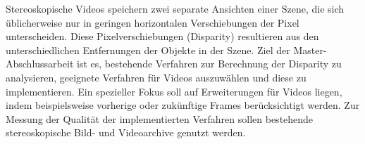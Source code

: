 Stereoskopische Videos speichern zwei separate Ansichten einer Szene, die sich {\"u}blicherweise nur in geringen horizontalen Verschiebungen der Pixel unterscheiden. Diese Pixelverschiebungen (Disparity) resultieren aus den unterschiedlichen Entfernungen der Objekte in der Szene. Ziel der Master-Abschlussarbeit ist es, bestehende Verfahren zur Berechnung der Disparity zu analysieren, geeignete Verfahren f{\"u}r Videos auszuw{\"a}hlen und diese zu implementieren. Ein spezieller Fokus soll auf Erweiterungen f{\"u}r Videos liegen, indem beispielsweise vorherige oder zuk{\"u}nftige Frames ber{\"u}cksichtigt werden. Zur Messung der Qualit{\"a}t der implementierten Verfahren sollen bestehende stereoskopische Bild- und Videoarchive genutzt werden.
